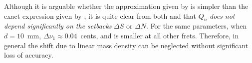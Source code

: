 

Although it is arguable whether the approximation given by  is simpler than the exact expression given by , it is quite clear from both  and  that $Q_n$ \emph{does not depend significantly on the setbacks} $\Delta S$ or $\Delta N$. For the same parameters, when $d = 10$~mm, $\Delta \nu_{1} \approx 0.04$~cents, and is smaller at all other frets. Therefore, in general the shift due to linear mass density can be neglected without significant loss of accuracy.

